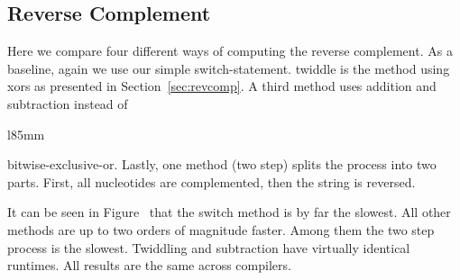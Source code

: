\documentclass[10pt,letterpaper]{article}
\begin{document}
\subsection{Reverse Complement}
{
Here we compare four different ways of computing the reverse complement. As a baseline, again we use our simple switch-statement. twiddle is the method using xors as presented in Section~\ref{sec:revcomp}. A third method uses addition and subtraction instead of

\begin{wrapfigure}{l}{85mm}
    \captionsetup{labelformat=empty} %
    \caption{}
    \label{fig:revcomp}
\end{wrapfigure}
\noindent bitwise-exclusive-or. Lastly, one method (two step) splits the process into two parts. First, all nucleotides are complemented, then the string is reversed.

It can be seen in Figure~{} that the switch method is by far the slowest. All other methods are up to two orders of magnitude faster. Among them the two step process is the slowest. Twiddling and subtraction have virtually identical runtimes. All results are the same across compilers.

}
\end{document}
